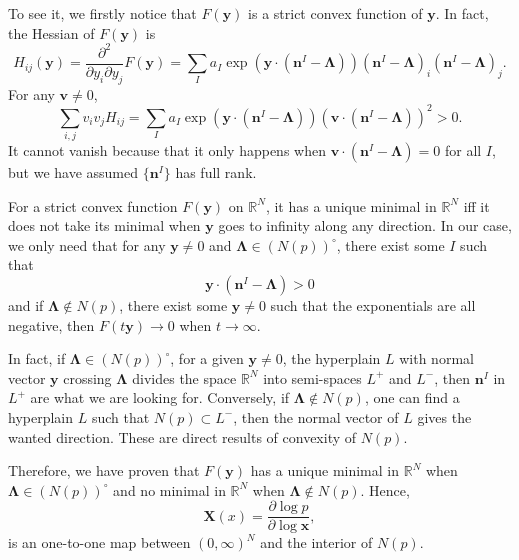 \documentclass[12pt]{article}
\theoremstyle{definition}
\theoremstyle{plain}
\begin{document}
To see it, we firstly notice that $F(\mathbf y)$ is a strict convex function of $\mathbf y$. In fact, the Hessian of $F(\mathbf y)$ is 
\[
	H_{ij}(\mathbf y)=\frac{\partial^2}{\partial y_i\partial y_j}F(\mathbf y)=\sum_I a_I \exp\left(\mathbf{y}\cdot \left(\mathbf{n}^I-\mathbf{\Lambda}\right)\right)\left(\mathbf{n}^I-\mathbf{\Lambda}\right)_i\left(\mathbf{n}^I-\mathbf{\Lambda}\right)_j.
\]
For any $\mathbf v\neq 0$, 
\[
	\sum_{i,j}v_iv_jH_{ij}=\sum_I a_I \exp\left(\mathbf{y}\cdot \left(\mathbf{n}^I-\mathbf{\Lambda}\right)\right) \left(\mathbf v\cdot (\mathbf{n}^I-\mathbf{\Lambda})\right)^2 >0.
\]
It cannot vanish because that it only happens when $\mathbf v\cdot (\mathbf{n}^I-\mathbf{\Lambda})=0$ for all $I$, but we have assumed $\{\mathbf n^I\}$ has full rank.

For a strict convex function $F(\mathbf y)$ on $\mathbb R^N$, it has a unique minimal in $\mathbb R^N$ iff it does not take its minimal when $\mathbf{y}$ goes to infinity along any direction. In our case, we only need that for any $\mathbf{y}\neq 0$ and $\mathbf\Lambda \in (N(p))^\circ $, there exist some $I$ such that  
\[
	\mathbf{y}\cdot (\mathbf{n}^I-\mathbf{\Lambda})>0
\]
and if $\mathbf\Lambda \not\in N(p)$, there exist some $\mathbf{y}\neq 0$ such that the exponentials are all negative, then $F(t\mathbf y)\to 0$ when $t\to \infty$.


In fact, if $\mathbf\Lambda \in (N(p))^\circ$, for a given $\mathbf y\neq 0$, the hyperplain $L$ with normal vector $\mathbf y$ crossing $\mathbf \Lambda$ divides the space $\mathbb R^N$ into semi-spaces $L^+$ and $L^-$, then $\mathbf{n}^I$ in $L^+$ are what we are looking for. Conversely, if $\mathbf\Lambda \not\in N(p)$, one can find a hyperplain $L$ such that $N(p)\subset L^-$, then the normal vector of $L$ gives the wanted direction. These are direct results of convexity of $N(p)$.

Therefore, we have proven that $F(\mathbf y)$ has a unique minimal in $\mathbb R^N$ when $\mathbf \Lambda \in (N(p))^\circ$ and no minimal in $\mathbb R^N$ when $\mathbf \Lambda \not\in N(p)$. Hence, 
\[
	\mathbf X(x)=\frac{\partial \log p}{\partial \log \mathbf x},
\]
is an one-to-one map between $(0,\infty)^N$ and the interior of $N(p)$.
\end{document}
